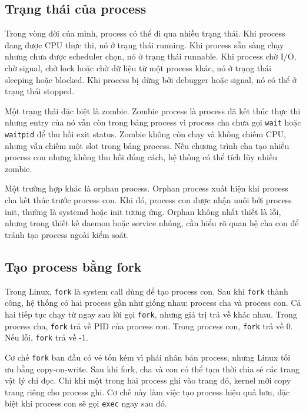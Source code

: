 \documentclass[11pt]{article}
\newcommand{\code}[1]{\texttt{#1}}
\begin{document}
\subsection{Trạng thái của process}

Trong vòng đời của mình, process có thể đi qua nhiều trạng thái. Khi process đang được CPU thực thi, nó ở trạng thái running. Khi process sẵn sàng chạy nhưng chưa được scheduler chọn, nó ở trạng thái runnable. Khi process chờ I/O, chờ signal, chờ lock hoặc chờ dữ liệu từ một process khác, nó ở trạng thái sleeping hoặc blocked. Khi process bị dừng bởi debugger hoặc signal, nó có thể ở trạng thái stopped.

Một trạng thái đặc biệt là zombie. Zombie process là process đã kết thúc thực thi nhưng entry của nó vẫn còn trong bảng process vì process cha chưa gọi \code{wait} hoặc \code{waitpid} để thu hồi exit status. Zombie không còn chạy và không chiếm CPU, nhưng vẫn chiếm một slot trong bảng process. Nếu chương trình cha tạo nhiều process con nhưng không thu hồi đúng cách, hệ thống có thể tích lũy nhiều zombie.

Một trường hợp khác là orphan process. Orphan process xuất hiện khi process cha kết thúc trước process con. Khi đó, process con được nhận nuôi bởi process init, thường là systemd hoặc init tương ứng. Orphan không nhất thiết là lỗi, nhưng trong thiết kế daemon hoặc service nhúng, cần hiểu rõ quan hệ cha con để tránh tạo process ngoài kiểm soát.

\subsection{Tạo process bằng fork}

Trong Linux, \code{fork} là system call dùng để tạo process con. Sau khi \code{fork} thành công, hệ thống có hai process gần như giống nhau: process cha và process con. Cả hai tiếp tục chạy từ ngay sau lời gọi \code{fork}, nhưng giá trị trả về khác nhau. Trong process cha, \code{fork} trả về PID của process con. Trong process con, \code{fork} trả về 0. Nếu lỗi, \code{fork} trả về -1.

Cơ chế \code{fork} ban đầu có vẻ tốn kém vì phải nhân bản process, nhưng Linux tối ưu bằng copy-on-write. Sau khi fork, cha và con có thể tạm thời chia sẻ các trang vật lý chỉ đọc. Chỉ khi một trong hai process ghi vào trang đó, kernel mới copy trang riêng cho process ghi. Cơ chế này làm việc tạo process hiệu quả hơn, đặc biệt khi process con sẽ gọi \code{exec} ngay sau đó.
\end{document}
